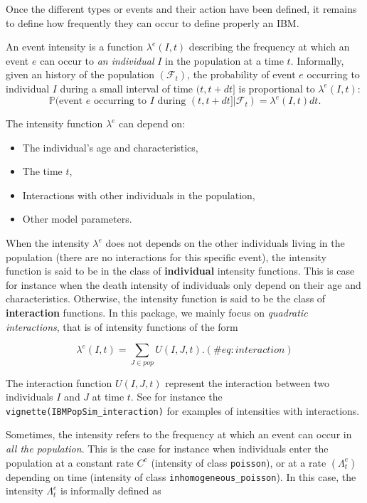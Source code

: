 Once the different types or events and their action have been defined, it remains to define how frequently they can occur to define properly an IBM.

An event intensity is a function \(\lambda^e(I,t)\) describing the frequency at which an event \(e\) can occur to \emph{an individual} \(I\) in the population at a time \(t\). Informally, given an history of the population \((\mathcal{F}_t)\), the probability of event \(e\) occurring to individual \(I\) during a small interval of time \((t,t+dt]\) is proportional to \(\lambda^e(I,t)\):
\begin{equation}
  \mathbb{P}(\text{event } e \text{ occurring to $I$ during } (t,t+dt] | \mathcal{F}_t) = \lambda^e(I,t)dt.
\end{equation}

The intensity function \(\lambda^e\) can depend on:

\begin{itemize}
\tightlist
\item
  The individual's age and characteristics,
\item
  The time \(t\),
\item
  Interactions with other individuals in the population,
\item
  Other model parameters.
\end{itemize}

When the intensity \(\lambda^e\) does not depends on the other individuals living in the population (there are no interactions for this specific event), the intensity function is said to be in the class of \textbf{individual} intensity functions. This is case for instance when the death intensity of individuals only depend on their age and characteristics.
Otherwise, the intensity function is said to be the class of \textbf{interaction} functions. In this package, we mainly focus on \emph{quadratic interactions}, that is of intensity functions of the form

\begin{equation}
\lambda^e(I,t) = \sum_{J \in pop} U(I,J,t).
  (\#eq:interaction)
\end{equation}

The interaction function \(U(I,J,t)\) represent the interaction between two individuals \(I\) and \(J\) at time \(t\). See for instance the \texttt{vignette(\textquotesingle{}IBMPopSim\_interaction\textquotesingle{})} for examples of intensities with interactions.

Sometimes, the intensity refers to the frequency at which an event can occur in \emph{all the population}. This is the case for instance when individuals enter the population at a constant rate \(C^e\) (intensity of class \texttt{poisson}), or at a rate \((\Lambda^e_t)\) depending on time (intensity of class \texttt{inhomogeneous\_poisson}). In this case, the intensity \(\Lambda^e_t\) is informally defined as

